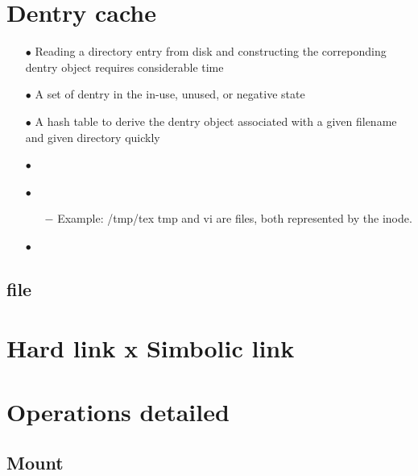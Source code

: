 \documentclass{beamer}
\begin{document}

\section{Dentry cache}
	\begin{itemize}[<+->]
		\item[$\bullet$]{Reading a directory entry from disk and constructing the correponding dentry object requires considerable time}
		\item[$\bullet$]{A set of dentry in the in-use, unused, or negative state}
		\item[$\bullet$]{A hash table to derive the dentry object associated with a given filename and  given directory quickly}
		\item[$\bullet$]{}
		\item[$\bullet$]{}
			\begin{itemize}
				\item[$-$]{Example: /tmp/tex \newline tmp and vi are files, both represented by the inode.}
			\end{itemize}
		\item[$\bullet$]{}
	\end{itemize}


\subsection{file}

\section{Hard link x Simbolic link}

\section{Operations detailed}

\subsection{Mount}
\end{document}
